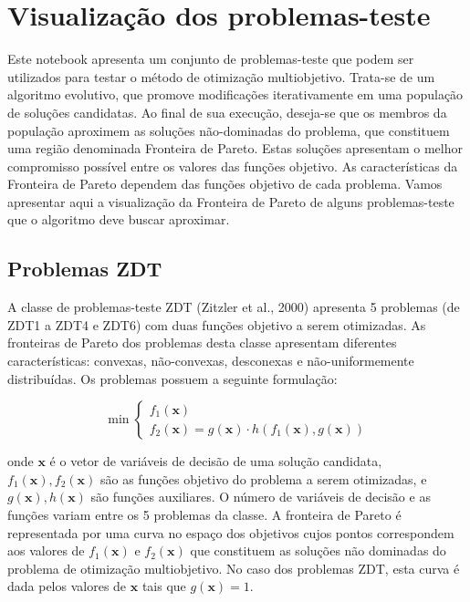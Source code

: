 \documentclass[11pt]{article}
\begin{document}
    \section{Visualização dos
problemas-teste}\label{visualizauxe7uxe3o-dos-problemas-teste}

Este notebook apresenta um conjunto de problemas-teste que podem ser
utilizados para testar o método de otimização multiobjetivo. Trata-se de
um algoritmo evolutivo, que promove modificações iterativamente em uma
população de soluções candidatas. Ao final de sua execução, deseja-se
que os membros da população aproximem as soluções não-dominadas do
problema, que constituem uma região denominada Fronteira de Pareto.
Estas soluções apresentam o melhor compromisso possível entre os valores
das funções objetivo. As características da Fronteira de Pareto dependem
das funções objetivo de cada problema. Vamos apresentar aqui a
visualização da Fronteira de Pareto de alguns problemas-teste que o
algoritmo deve buscar aproximar.

    \subsection{Problemas ZDT}\label{problemas-zdt}

A classe de problemas-teste ZDT (Zitzler et al., 2000) apresenta 5
problemas (de ZDT1 a ZDT4 e ZDT6) com duas funções objetivo a serem
otimizadas. As fronteiras de Pareto dos problemas desta classe
apresentam diferentes características: convexas, não-convexas,
desconexas e não-uniformemente distribuídas. Os problemas possuem a
seguinte formulação:

\[
\min
\begin{cases}
f_1(\mathbf{x})\\
f_2(\mathbf{x}) = g(\mathbf{x}) \cdot h(f_1(\mathbf{x}),g(\mathbf{x}))
\end{cases}
\]

onde \(\mathbf{x}\) é o vetor de variáveis de decisão de uma solução
candidata, \(f_1(\mathbf{x}), f_2(\mathbf{x})\) são as funções objetivo
do problema a serem otimizadas, e \(g(\mathbf{x}), h(\mathbf{x})\) são
funções auxiliares. O número de variáveis de decisão e as funções variam
entre os 5 problemas da classe. A fronteira de Pareto é representada por
uma curva no espaço dos objetivos cujos pontos correspondem aos valores
de \(f_1(\mathbf{x})\) e \(f_2(\mathbf{x})\) que constituem as soluções
não dominadas do problema de otimização multiobjetivo. No caso dos
problemas ZDT, esta curva é dada pelos valores de \(\mathbf{x}\) tais
que \(g(\mathbf{x}) = 1\).
\end{document}
